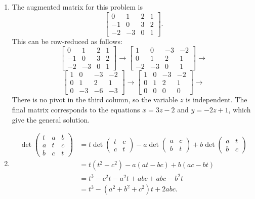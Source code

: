 \documentclass{amsart}
\newcommand{\xra}{\xrightarrow}
\renewcommand{\:}       {\colon}
\newcommand{\bbm}{\begin{pmatrix}}
\newcommand{\ebm}{\end{pmatrix}}
\begin{document}
\begin{enumerate}
 \item %
  The augmented matrix for this problem is
  \[ \left[\begin{array}{ccc|c}
      0&1&2 & 1 \\ -1&0&3 & 2 \\ -2&-3&0 & 1 
     \end{array}\right].
  \]
  This can be row-reduced as follows:
  {\tiny
   \[ \left[\begin{array}{ccc|c}
       0&1&2 & 1 \\ -1&0&3 & 2 \\ -2&-3&0 & 1 
      \end{array}\right] \xra{}
      \left[\begin{array}{ccc|c}
       1&0&-3 & -2 \\ 0&1&2 & 1 \\ -2&-3&0 & 1 
      \end{array}\right] \xra{}
    \] \[
      \left[\begin{array}{ccc|c} 
       1&0&-3 & -2 \\ 0&1&2 & 1 \\ 0&-3&-6 & -3 
      \end{array}\right] \xra{}
      \left[\begin{array}{ccc|c}
       1&0&-3 & -2 \\ 0&1&2 & 1 \\ 0&0&0 & 0 
      \end{array}\right] \xra{}
   \]}
  There is no pivot in the third column, so the variable $z$ is
  independent.  The final matrix corresponds to the equations
  $x=3z-2$ and $y=-2z+1$, which give the general solution.

 \item %
  {\small \begin{align*}
   \det\bbm t & a & b \\ a & t & c \\ b & c & t \ebm &= 
    t\det\bbm t&c \\ c&t \ebm - 
    a\det\bbm a&c \\ b&t \ebm +
    b\det\bbm a&t \\ b&c \ebm \\
   &= t(t^2-c^2) - a(at-bc) + b(ac-bt) \\ 
   &= t^3 - c^2 t - a^2t + abc + abc - b^2 t \\
   &= t^3 - (a^2+b^2+c^2) t + 2abc.
  \end{align*}}

\end{enumerate}
\end{document}
